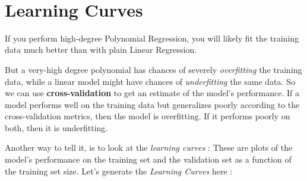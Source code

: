 \documentclass[11pt, a4paper]{book}
\begin{document}
    \begin{center}
    \end{center}
    { \hspace*{\fill} \\}
    
    \hypertarget{learning-curves}{%
\section{Learning Curves}\label{learning-curves}}

If you perform high-degree Polynomial Regression, you will likely fit
the training data much better than with plain Linear Regression.

But a very-high degree polynomial has chances of severely
\emph{overfitting} the training data, while a linear model might have
chances of \emph{underfitting} the same data. So we can use
\textbf{cross-validation} to get an estimate of the model's performance.
If a model performs well on the training data but generalizes poorly
according to the cross-validation metrics, then the model is
overfitting. If it performs poorly on both, then it is underfitting.

Another way to tell it, is to look at the \emph{learning curves} : These
are plots of the model's performance on the training set and the
validation set as a function of the training set size. Let's generate
the \emph{Learning Curves} here :
\end{document}

